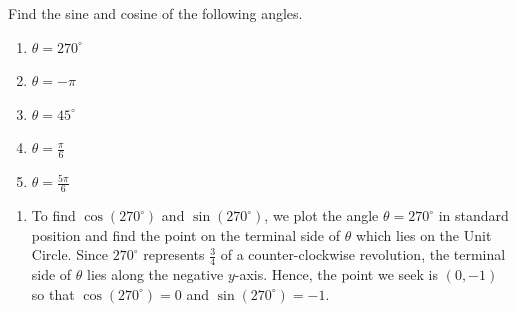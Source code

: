 \documentclass{ximera}
\begin{document}
\begin{example} \label{cosinesineviaunitcircle}  Find the sine and cosine of the following angles.

\begin{enumerate}

\item  $\theta = 270^{\circ}$

\item $\theta = - \pi$

\item  $\theta = 45^{\circ}$

\item  $\theta = \frac{\pi}{6}$

\item  $\theta = \frac{5\pi}{6}$ \label{refangleintro}

\end{enumerate}

\begin{explanation}

\begin{enumerate}

\item  To find $\cos\left(270^{\circ}\right)$ and $\sin\left(270^{\circ}\right)$, we plot the angle $\theta =270^{\circ}$ in standard position and find the point on the terminal side of $\theta$ which lies on the Unit Circle.  Since $270^{\circ}$ represents $\frac{3}{4}$ of a counter-clockwise revolution, the terminal side of $\theta$ lies along the negative $y$-axis.  Hence, the point we seek is $(0,-1)$ so that  $\cos\left(270^{\circ}\right) = 0$ and $\sin\left(270^{\circ}\right) = -1$.

\begin{image}
\end{image}
\end{enumerate}
\end{explanation}
\end{example}
\end{document}
